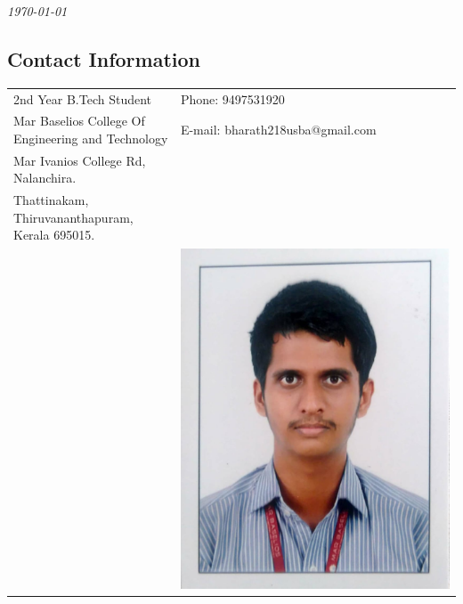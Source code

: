\documentclass[margin,line]{res}
\begin{document}
 \hfill {\em \today}

\begin{resume}
\section{\sc Contact Information}

\vspace{.05in}
\begin{tabular}{@{}p{3.5in}p{3in}}
2nd  Year B.Tech Student                                                                     & {Phone:}  9497531920 \\
Mar Baselios College Of Engineering
and Technology 
 & {E-mail:}  bharath218usba@gmail.com\\
Mar Ivanios College Rd, Nalanchira.\\
Thattinakam, Thiruvananthapuram, Kerala 695015.\\ 
&
\includegraphics[width=0.1\textheight]{bh}

\end{tabular}


\end{resume}
\end{document}
